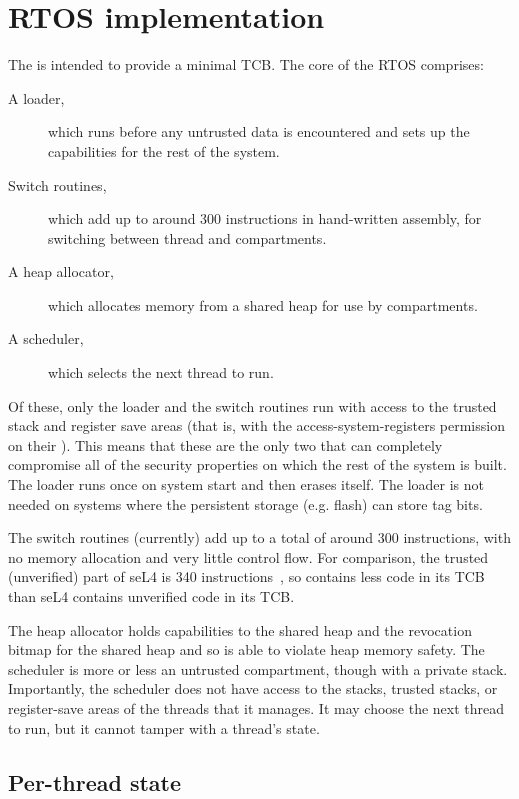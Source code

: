 \chapter{RTOS implementation}
\label{chap:rtos}

The \cherimcuos{} is intended to provide a minimal TCB.
The core of the RTOS comprises:

\begin{description}
	\item[A loader,] which runs before any untrusted data is encountered and sets up the capabilities for the rest of the system.
	\item[Switch routines,] which add up to around 300 instructions in hand-written assembly, for switching between thread and compartments.
	\item[A heap allocator,] which allocates memory from a shared heap for use by compartments.
	\item[A scheduler,] which selects the next thread to run.
\end{description}

Of these, only the loader and the switch routines run with access to the trusted stack and register save areas (that is, with the access-system-registers permission on their \PCC).
This means that these are the only two that can completely compromise all of the security properties on which the rest of the system is built.
The loader runs once on system start and then erases itself.
The loader is not needed on systems where the persistent storage (e.g. flash) can store tag bits.

The switch routines (currently) add up to a total of around 300 instructions, with no memory allocation and very little control flow.
For comparison, the trusted (unverified) part of seL4 is 340 instructions~\cite{sel4-faq}, so \cherimcuos{} contains less code in its TCB than seL4 contains unverified code in its TCB.

The heap allocator holds capabilities to the shared heap and the revocation bitmap for the shared heap and so is able to violate heap memory safety.
The scheduler is more or less an untrusted compartment, though with a private stack.
Importantly, the scheduler does not have access to the stacks, trusted stacks, or register-save areas of the threads that it manages.
It may choose the next thread to run, but it cannot tamper with a thread's state.

\section{Per-thread state}

